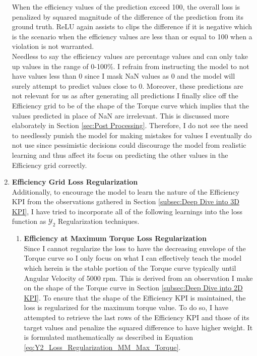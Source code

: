 \documentclass{report} %
\begin{document}
\begin{enumerate}
When the efficiency values of the prediction exceed 100, the overall loss is penalized by squared magnitude of the difference of the prediction from its ground truth.
\ac{ReLU} again assists to clips the difference if it is negative which is the scenario when the efficiency values are less than or equal to 100 when a violation is not warranted. \\
Needless to say the efficiency values are percentage values and can only take up values in the range of 0-100\%.
I refrain from instructing the model to not have values less than 0 since I mask \ac{NaN} values as 0 and the model will surely attempt to predict values close to 0.
Moreover, these predictions are not relevant for us as after generating all predictions I finally slice off the Efficiency grid to be of the shape of the Torque curve 
which implies that the values predicted in place of \ac{NaN} are irrelevant. This is discussed more elaborately in Section \ref{sec:Post Processing}.
Therefore, I do not see the need to needlessly punish the model for making mistakes for values I eventually do not use since pessimistic decisions could discourage the 
model from realistic learning and thus affect its focus on predicting the other values in the Efficiency grid correctly.
\item \textbf{Efficiency Grid Loss Regularization} \\
Additionally, to encourage the model to learn the nature of the Efficiency \ac{KPI} from the observations gathered in Section \ref{subsec:Deep Dive into 3D KPI}, I have 
tried to incorporate all of the following learnings into the loss function as $\mathcal{Y}_2$ Regularization techniques.
\begin{enumerate}
\item \textbf{Efficiency at Maximum Torque Loss Regularization} \\
Since I cannot regularize the loss to have the decreasing envelope of the Torque curve so I only focus on what I can effectively teach the model which 
herein is the stable portion of the Torque curve typically until Angular Velocity of 5000 rpm. This is derived from an observation I make on the shape of the Torque 
curve in Section \ref{subsec:Deep Dive into 2D KPI}.
To ensure that the shape of the Efficiency \ac{KPI} is maintained, the loss is regularized for the maximum torque value.
To do so, I have attempted to retrieve the last rows of the Efficiency \ac{KPI} and those of its target values and penalize the squared difference to have higher weight.
It is formulated mathematically as described in Equation \ref{eq:Y2_Loss_Regularization_MM_Max_Torque}.

\end{enumerate}
\end{enumerate}
\end{document}
